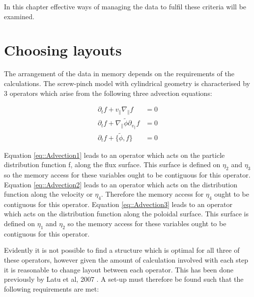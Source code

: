 In this chapter effective ways of managing the data to fulfil these criteria will be examined.

\section{Choosing layouts}

The arrangement of the data in memory depends on the requirements of the calculations. The screw-pinch model with cylindrical geometry is characterised by 3 operators which arise from the following three advection equations:

\begin{align}
 \partial_t f + v_\parallel \nabla_\parallel f &= 0 \label{eq::Advection1}\\
 \partial_t f + \nabla_\parallel \tilde{\phi} \partial_{v_{\parallel}} f &= 0 \label{eq::Advection2}\\
 \partial_t f + \{\tilde{\phi}, f\} &= 0 \label{eq::Advection3}
\end{align}

Equation \ref{eq::Advection1} leads to an operator which acts on the particle distribution function f, along the flux surface. This surface is defined on $\eta_2$ and $\eta_3$ so the memory access for these variables ought to be contiguous for this operator. Equation \ref{eq::Advection2} leads to an operator which acts on the distribution function along the velocity or $\eta_4$. Therefore  the memory access for $\eta_4$ ought to be contiguous for this operator. Equation \ref{eq::Advection3} leads to an operator which acts on the distribution function along the poloidal surface. This surface is defined on $\eta_1$ and $\eta_2$ so the memory access for these variables ought to be contiguous for this operator.

Evidently it is not possible to find a structure which is optimal for all three of these operators, however given the amount of calculation involved with each step it is reasonable to change layout between each operator. This has been done previously by Latu et al, 2007 \cite{Gysela5D}. A set-up must therefore be found such that the following requirements are met:

